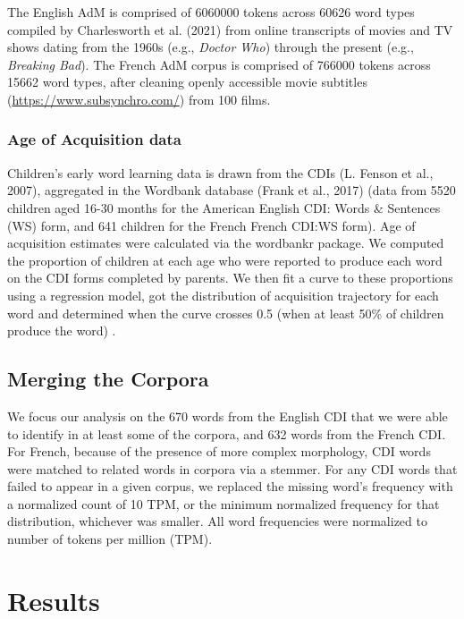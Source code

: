 \documentclass[10pt, letterpaper]{article}
\begin{document}
The English AdM is comprised of 6060000 tokens across 60626 word types
compiled by Charlesworth et al. (2021) from online transcripts of movies
and TV shows dating from the 1960s (e.g., \emph{Doctor Who}) through the
present (e.g., \emph{Breaking Bad}). The French AdM corpus is comprised
of 766000 tokens across 15662 word types, after cleaning openly
accessible movie subtitles (\url{https://www.subsynchro.com/}) from 100
films.

\hypertarget{age-of-acquisition-data}{%
\subsubsection{Age of Acquisition data}\label{age-of-acquisition-data}}

Children's early word learning data is drawn from the CDIs (L. Fenson et
al., 2007), aggregated in the Wordbank database (Frank et al., 2017)
(data from 5520 children aged 16-30 months for the American English CDI:
Words \& Sentences (WS) form, and 641 children for the French French
CDI:WS form). Age of acquisition estimates were calculated via the
wordbankr package. We computed the proportion of children at each age
who were reported to produce each word on the CDI forms completed by
parents. We then fit a curve to these proportions using a regression
model, got the distribution of acquisition trajectory for each word and
determined when the curve crosses 0.5 (when at least 50\% of children
produce the word) .

\hypertarget{merging-the-corpora}{%
\subsection{Merging the Corpora}\label{merging-the-corpora}}

We focus our analysis on the 670 words from the English CDI that we were
able to identify in at least some of the corpora, and 632 words from the
French CDI. For French, because of the presence of more complex
morphology, CDI words were matched to related words in corpora via a
stemmer. For any CDI words that failed to appear in a given corpus, we
replaced the missing word's frequency with a normalized count of 10 TPM,
or the minimum normalized frequency for that distribution, whichever was
smaller. All word frequencies were normalized to number of tokens per
million (TPM).

\hypertarget{results}{%
\section{Results}\label{results}}
\end{document}
